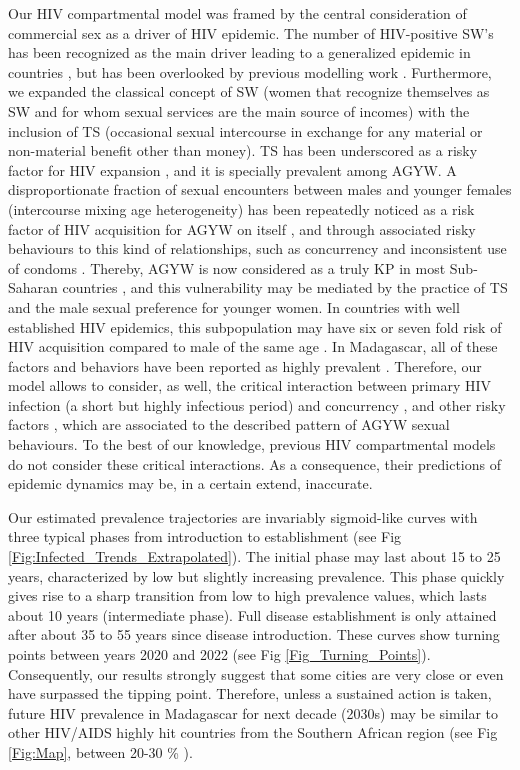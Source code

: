 \documentclass[preprint,12pt]{elsarticle}
\begin{document}
Our HIV compartmental model was framed by the central consideration of commercial sex as a driver of HIV epidemic. The number of HIV-positive SW's has been recognized as the main driver leading to a generalized epidemic in countries \cite{Talbott2007}, but has been overlooked by previous modelling work \cite{Kim2014,Omondi2018,Mukandarive2007}. Furthermore, we expanded the classical concept of SW (women that recognize themselves as SW and for whom sexual services are the main source of incomes) with the inclusion of TS (occasional sexual intercourse in exchange for any material or non-material benefit other than money). TS has been underscored as a risky factor for HIV expansion \cite{Wamoyi2016}, and it is specially prevalent among AGYW. A disproportionate fraction of sexual encounters between males and younger females (intercourse mixing age heterogeneity)  has been repeatedly noticed as a risk factor of HIV acquisition for AGYW on itself \cite{Stoner2020}  , and through associated risky behaviours to this kind of relationships, such as concurrency and inconsistent use of condoms \cite{Anderson1992,Maughan-Brown2016,George2019a,Evans2017}. Thereby, AGYW is now considered as a truly KP in most Sub-Saharan countries \cite{Dellar2016}, and this vulnerability may be mediated by the practice of TS and the male sexual preference for younger women. In countries with well established HIV epidemics, this subpopulation may have six or seven fold risk of HIV acquisition compared to male of the same age  \cite{Leclerc2008,Dellar2016}. In Madagascar, all of these factors and behaviors have been reported as highly prevalent \cite{Raberahona2020}. Therefore, our model allows to consider, as well, the critical interaction between primary HIV infection (a short but highly infectious period) and concurrency \cite{Eaton2011,Mah2011,Kim2010,Goodreau2012}, and other risky factors \cite{Hollingsworth2008}, which are associated to the described pattern of AGYW sexual behaviours. To the best of our knowledge, previous HIV compartmental models do not consider these critical interactions. As a consequence, their predictions of epidemic dynamics may be, in a certain extend, inaccurate.
\smallskip

Our estimated prevalence trajectories are invariably sigmoid-like curves with three typical phases from introduction to establishment (see Fig \ref{Fig:Infected_Trends_Extrapolated}). The initial phase may last about 15 to 25 years, characterized by low but slightly increasing prevalence. This phase quickly gives rise to a sharp transition from low to high prevalence values, which lasts about 10 years (intermediate phase). Full disease establishment is only attained after about 35 to 55 years since disease introduction. These curves show turning points between years 2020 and 2022 (see Fig \ref{Fig_Turning_Points}). Consequently, our results strongly suggest that some cities are very close or even have surpassed the tipping point. Therefore, unless a sustained action is taken, future HIV prevalence in Madagascar for next decade (2030s) may be similar to other HIV/AIDS highly hit countries from the Southern African region (see Fig \ref{Fig:Map}, between 20-30 \% \cite{Epstein2011}). 
\smallskip
\end{document}
